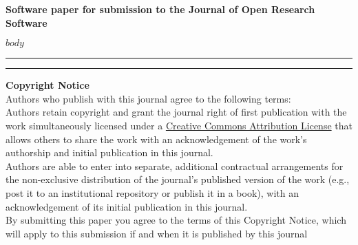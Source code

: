 \documentclass{jors}
\begin{document}
{\bf Software paper for submission to the Journal of Open Research Software}

$body$

\vspace{2cm}

\rule{\textwidth}{1pt}




\vspace{2cm}

\rule{\textwidth}{1pt}

{ \bf Copyright Notice} \\
Authors who publish with this journal agree to the following terms: \\

Authors retain copyright and grant the journal right of first publication with the work simultaneously licensed under a  \href{http://creativecommons.org/licenses/by/3.0/}{Creative Commons Attribution License} that allows others to share the work with an acknowledgement of the work's authorship and initial publication in this journal. \\

Authors are able to enter into separate, additional contractual arrangements for the non-exclusive distribution of the journal's published version of the work (e.g., post it to an institutional repository or publish it in a book), with an acknowledgement of its initial publication in this journal. \\

By submitting this paper you agree to the terms of this Copyright Notice, which will apply to this submission if and when it is published by this journal
\end{document}
